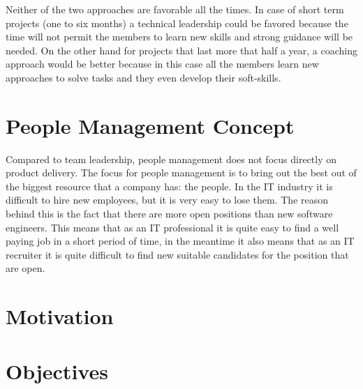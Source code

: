 Neither of the two approaches are favorable all the times. In case of short term projects (one to six months) a technical leadership could be favored because the time will not permit the members to learn new skills and strong guidance will be needed. On the other hand for projects that last more that half a year, a coaching approach would be better because in this case all the members learn new approaches to solve tasks and they even develop their soft-skills.

\section{People Management Concept}
\label{sec:proj-scope}
Compared to team leadership, people management does not focus directly on product delivery. The focus for people management is to bring out the best out of the biggest resource that a company has: the people. In the IT industry it is difficult to hire new employees, but it is very easy to lose them. The reason behind this is the fact that there are more open positions than new software engineers. This means that as an IT professional it is quite easy to find a well paying job in a short period of time, in the meantime it also means that as an IT recruiter it is quite difficult to find new suitable candidates for the position that are open. 


\cite{abur-pm}

\section{Motivation}
\label{sec:motivation}

\section{Objectives}
\label{sec:Objectives}
